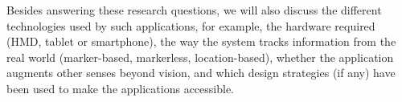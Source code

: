 

Besides answering these research questions, we will also discuss the different technologies used by such applications, for example, the hardware required (\gls{HMD}, tablet or smartphone), the way the system tracks information from the real world (marker-based, markerless, location-based), whether the application augments other senses beyond vision, and which design strategies (if any) have been used to make the applications accessible.

